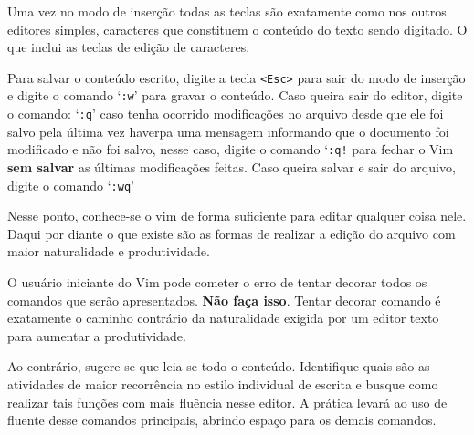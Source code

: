 Uma vez no modo de inserção todas as teclas são exatamente 
como nos outros editores simples, caracteres que constituem o conteúdo do texto 
sendo digitado. 
O que inclui as teclas de edição de caracteres.

Para salvar o conteúdo escrito, digite a tecla
\verb|<Esc>| para sair do modo de inserção e digite o comando `\texttt{:w}'
para gravar o conteúdo.  Caso queira sair do editor,
digite o comando: `\texttt{:q}' caso tenha ocorrido modificações no arquivo
desde que ele foi salvo pela última vez haverpa uma mensagem informando que o
documento foi modificado e não foi salvo, nesse caso, digite o comando `\texttt{:q!}
para fechar o Vim {\bf sem salvar} as últimas modificações feitas.  
Caso queira salvar e sair do arquivo, digite o comando `\texttt{:wq}'

%
%

Nesse ponto, conhece-se o vim de forma suficiente para editar
qualquer coisa nele. Daqui por diante o que existe são as formas de
realizar a edição do arquivo com maior naturalidade e produtividade.

O usuário iniciante do Vim pode cometer o erro de tentar decorar 
todos os comandos que serão apresentados. {\bf Não faça isso}. Tentar decorar
comando é exatamente o caminho contrário da naturalidade exigida por 
um editor texto para aumentar a produtividade.

Ao contrário, sugere-se que leia-se todo o conteúdo. Identifique 
quais são as atividades de maior recorrência no estilo individual de 
escrita e busque como realizar tais funções com mais fluência nesse
editor. A prática levará ao uso de fluente desse comandos principais,
abrindo espaço para os demais comandos.

